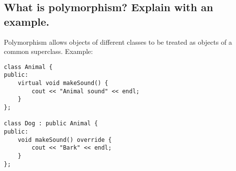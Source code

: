 \subsection{What is polymorphism? Explain with an example.}
Polymorphism allows objects of different classes to be treated as objects of a common superclass. Example:
\begin{tcolorbox}[title=Polymorphism]
\begin{verbatim}
class Animal {
public:
    virtual void makeSound() {
        cout << "Animal sound" << endl;
    }
};

class Dog : public Animal {
public:
    void makeSound() override {
        cout << "Bark" << endl;
    }
};
\end{verbatim}
\end{tcolorbox}

